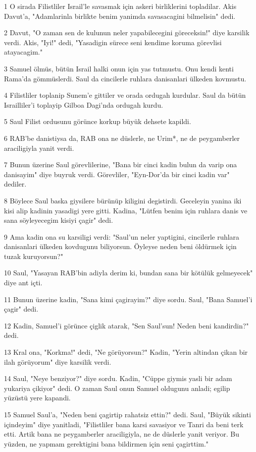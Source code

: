 \par 1 O sirada Filistliler Israil'le savasmak için askeri birliklerini topladilar. Akis Davut'a, "Adamlarinla birlikte benim yanimda savasacagini bilmelisin" dedi.
\par 2 Davut, "O zaman sen de kulunun neler yapabilecegini göreceksin!" diye karsilik verdi. Akis, "Iyi!" dedi, "Yasadigin sürece seni kendime koruma görevlisi atayacagim."
\par 3 Samuel ölmüs, bütün Israil halki onun için yas tutmustu. Onu kendi kenti Rama'da gömmüslerdi. Saul da cincilerle ruhlara danisanlari ülkeden kovmustu.
\par 4 Filistliler toplanip Sunem'e gittiler ve orada ordugah kurdular. Saul da bütün Israilliler'i toplayip Gilboa Dagi'nda ordugah kurdu.
\par 5 Saul Filist ordusunu görünce korkup büyük dehsete kapildi.
\par 6 RAB'be danistiysa da, RAB ona ne düslerle, ne Urim*, ne de peygamberler araciligiyla yanit verdi.
\par 7 Bunun üzerine Saul görevlilerine, "Bana bir cinci kadin bulun da varip ona danisayim" diye buyruk verdi. Görevliler, "Eyn-Dor'da bir cinci kadin var" dediler.
\par 8 Böylece Saul baska giysilere bürünüp kiligini degistirdi. Geceleyin yanina iki kisi alip kadinin yasadigi yere gitti. Kadina, "Lütfen benim için ruhlara danis ve sana söyleyecegim kisiyi çagir" dedi.
\par 9 Ama kadin ona su karsiligi verdi: "Saul'un neler yaptigini, cincilerle ruhlara danisanlari ülkeden kovdugunu biliyorsun. Öyleyse neden beni öldürmek için tuzak kuruyorsun?"
\par 10 Saul, "Yasayan RAB'bin adiyla derim ki, bundan sana bir kötülük gelmeyecek" diye ant içti.
\par 11 Bunun üzerine kadin, "Sana kimi çagirayim?" diye sordu. Saul, "Bana Samuel'i çagir" dedi.
\par 12 Kadin, Samuel'i görünce çiglik atarak, "Sen Saul'sun! Neden beni kandirdin?" dedi.
\par 13 Kral ona, "Korkma!" dedi, "Ne görüyorsun?" Kadin, "Yerin altindan çikan bir ilah görüyorum" diye karsilik verdi.
\par 14 Saul, "Neye benziyor?" diye sordu. Kadin, "Cüppe giymis yasli bir adam yukariya çikiyor" dedi. O zaman Saul onun Samuel oldugunu anladi; egilip yüzüstü yere kapandi.
\par 15 Samuel Saul'a, "Neden beni çagirtip rahatsiz ettin?" dedi. Saul, "Büyük sikinti içindeyim" diye yanitladi, "Filistliler bana karsi savasiyor ve Tanri da beni terk etti. Artik bana ne peygamberler araciligiyla, ne de düslerle yanit veriyor. Bu yüzden, ne yapmam gerektigini bana bildirmen için seni çagirttim."
